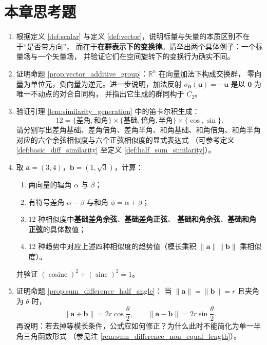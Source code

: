 \section*{本章思考题}

\begin{enumerate}[leftmargin=3em, label=\textbf{题 \arabic*}]
    \item 根据定义 \ref{def:scalar} 与定义 \ref{def:vector}，说明标量与矢量的本质区别不在于“是否带方向”，
    而在于\textbf{在群表示下的变换律}。请举出两个具体例子：一个标量场与一个矢量场，
    并验证它们在空间旋转下的变换行为确实不同。

    \item 证明命题 \ref{prop:vector_additive_group}：$\mathbb{R}^n$ 在向量加法下构成交换群，
    零向量为单位元，负向量为逆元。进一步说明，加法反射
    $\sigma_{\mathbf{0}}(\mathbf{u})=-\mathbf{u}$ 是以 $\mathbf{0}$ 为唯一不动点的对合自同构，
    并指出它生成的群同构于 $C_2$。

    \item 验证引理 \ref{lem:similarity_generation} 中的笛卡尔积生成：
    \[
    12=\{\text{差角},\text{和角}\}\times\{\text{基础},\text{倍角},\text{半角}\}\times\{\cos,\sin\}.
    \]
    请分别写出差角基础、差角倍角、差角半角、和角基础、和角倍角、和角半角
    对应的六个余弦相似度与六个正弦相似度的显式表达式
    （可参考定义 \ref{def:basic_diff_similarity} 至定义 \ref{def:half_sum_similarity}）。

    \item 取 $\mathbf{a}=(3,4)$，$\mathbf{b}=(1,\sqrt{3})$，计算：
    \begin{enumerate}[label=(\roman*)]
        \item 两向量的辐角 $\alpha$ 与 $\beta$；
        \item 有符号差角 $\alpha-\beta$ 与和角 $\phi=\alpha+\beta$；
        \item 12 种相似度中\textbf{基础差角余弦}、\textbf{基础差角正弦}、
              \textbf{基础和角余弦}、\textbf{基础和角正弦}的具体数值；
        \item 12 种趋势中对应上述四种相似度的趋势值（模长乘积 $\|\mathbf{a}\|\|\mathbf{b}\|$ 乘相似度）。
    \end{enumerate}
    并验证 $(\operatorname{cosine})^2+(\operatorname{sine})^2=1$。

    \item 证明命题 \ref{prop:sum_difference_half_angle}：
    当 $\|\mathbf{a}\|=\|\mathbf{b}\|=r$ 且夹角为 $\theta$ 时，
    \[
    \|\mathbf{a}+\mathbf{b}\|=2r\cos\frac{\theta}{2},\qquad
    \|\mathbf{a}-\mathbf{b}\|=2r\sin\frac{\theta}{2}.
    \]
    再说明：若去掉等模长条件，公式应如何修正？为什么此时不能简化为单一半角三角函数形式
    （参见注 \ref{rem:sum_difference_non_equal_length}）。


\end{enumerate}
